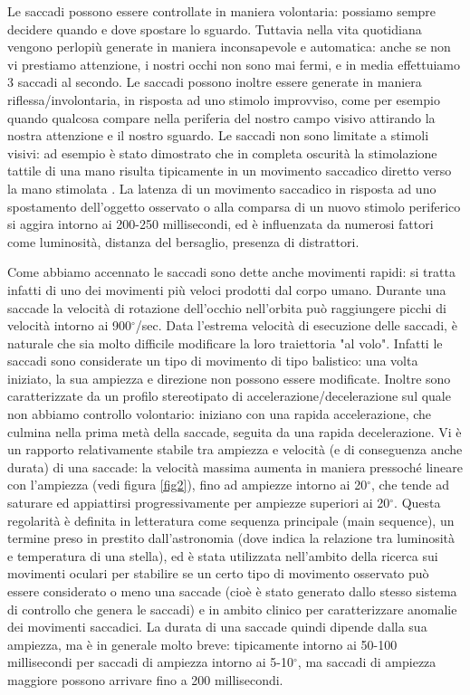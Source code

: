 \documentclass[12pt]{article}
\begin{document}
Le saccadi possono essere controllate in maniera volontaria: possiamo sempre decidere quando e dove spostare lo sguardo. Tuttavia nella vita quotidiana vengono perlopiù generate in maniera inconsapevole e automatica: anche se non vi prestiamo attenzione, i nostri occhi non sono mai fermi, e in media effettuiamo 3 saccadi al secondo. Le saccadi possono inoltre essere generate in maniera riflessa/involontaria, in risposta ad uno stimolo improvviso, come per esempio quando qualcosa compare nella periferia del nostro campo visivo attirando la nostra attenzione e il nostro sguardo. Le saccadi non sono limitate a stimoli visivi: ad esempio è stato dimostrato che in completa oscurità la stimolazione tattile di una mano risulta tipicamente in un movimento saccadico diretto verso la mano stimolata \cite{Groh1996}. La latenza di un movimento saccadico in risposta ad uno spostamento dell'oggetto osservato o alla comparsa di un nuovo stimolo periferico si aggira intorno ai 200-250 millisecondi, ed è influenzata da numerosi fattori come luminosità, distanza del bersaglio, presenza di distrattori.

Come abbiamo accennato le saccadi sono dette anche movimenti rapidi: si tratta infatti di uno dei movimenti più veloci prodotti dal corpo umano. Durante una saccade la velocità di rotazione dell'occhio nell'orbita può raggiungere picchi di velocità intorno ai 900$^{\circ}$/sec. Data l'estrema velocità di esecuzione delle saccadi, è naturale che sia molto difficile modificare la loro traiettoria "al volo". Infatti le saccadi sono considerate un tipo di movimento di tipo balistico: una volta iniziato, la sua ampiezza e direzione non possono essere modificate. Inoltre sono caratterizzate da un profilo stereotipato di accelerazione/decelerazione sul quale non abbiamo controllo volontario: iniziano con una rapida accelerazione, che culmina nella prima metà della saccade, seguita da una rapida decelerazione. Vi è un rapporto relativamente stabile tra ampiezza e velocità (e di conseguenza anche durata) di una saccade: la velocità massima aumenta in maniera pressoché lineare con l'ampiezza (vedi figura \ref{fig2}), fino ad ampiezze intorno ai 20$^{\circ}$, che tende ad saturare ed appiattirsi progressivamente per ampiezze superiori ai 20$^{\circ}$. Questa regolarità è definita in letteratura come sequenza principale (main sequence), un termine preso in prestito dall'astronomia (dove indica la relazione tra luminosità e temperatura di una stella), ed è stata utilizzata nell'ambito della ricerca sui movimenti oculari per stabilire se un certo tipo di movimento osservato può essere considerato o meno una saccade (cioè è stato generato dallo stesso sistema di controllo che genera le saccadi) e in ambito clinico per caratterizzare anomalie dei movimenti saccadici. La durata di una saccade quindi dipende dalla sua ampiezza, ma è in generale molto breve: tipicamente intorno ai 50-100 millisecondi per saccadi di ampiezza intorno ai 5-10$^{\circ}$, ma saccadi di ampiezza maggiore possono arrivare fino a 200 millisecondi. 
\end{document}
